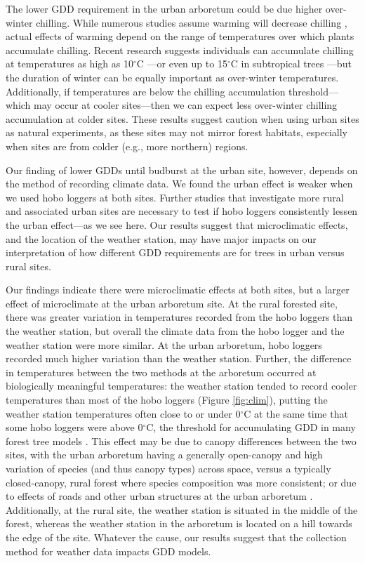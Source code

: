 \documentclass{article}\usepackage[]{graphicx}\usepackage[]{color}
\begin{document}
The lower GDD requirement in the urban arboretum could be due higher over-winter chilling. While numerous studies assume warming will decrease chilling \citep{Luedeling2011,Fu2015,Asse2018}, actual effects of warming depend on the range of temperatures over which plants accumulate chilling. Recent research suggests individuals can accumulate chilling at temperatures as high as 10$^{\circ}$C \citep{Baumgarten2021}---or even up to 15$^{\circ}$C in subtropical trees \citep{Zhang2021}---but the duration of winter can be equally important as over-winter temperatures. Additionally, if temperatures are below the chilling accumulation threshold---which may occur at cooler sites---then we can expect less over-winter chilling accumulation at colder sites. These results suggest caution when using urban sites as natural experiments, as these sites may not mirror forest habitats, especially when sites are from colder (e.g., more northern) regions. 

Our finding of lower GDDs until budburst at the urban site, however, depends on the method of recording climate data. We found the urban effect is weaker when we used hobo loggers at both sites. Further studies that investigate more rural and associated urban sites are necessary to test if hobo loggers consistently lessen the urban effect---as we see here. Our results suggest that microclimatic effects, and the location of the weather station, may have major impacts on our interpretation of how different GDD requirements are for trees in urban versus rural sites. 

Our findings indicate there were microclimatic effects at both sites, but a larger effect of microclimate at the urban arboretum site. At the rural forested site, there was greater variation in temperatures recorded from the hobo loggers than the weather station, but overall the climate data from the hobo logger and the weather station were more similar. At the urban arboretum, hobo loggers recorded much higher variation than the weather station. Further, the difference in temperatures between the two methods at the arboretum occurred at biologically meaningful temperatures: the weather station tended to record cooler temperatures than most of the hobo loggers (Figure \ref{fig:clim}), putting the weather station temperatures often close to or under 0$^{\circ}$C at the same time that some hobo loggers were above 0$^{\circ}$C, the threshold for accumulating GDD in many forest tree models \citep{Man2010}. This effect may be due to canopy differences between the two sites, with the urban arboretum having a generally open-canopy and high variation of species (and thus canopy types) across space, versus a typically closed-canopy, rural forest where species composition was more consistent; or due to effects of roads and other urban structures at the urban arboretum \citep{Stabler2005,Erell2012,Dimoudi2013}. Additionally, at the rural site, the weather station is situated in the middle of the forest, whereas the weather station in the arboretum is located on a hill towards the edge of the site. Whatever the cause, our results suggest that the collection method for weather data impacts GDD models.
\end{document}
